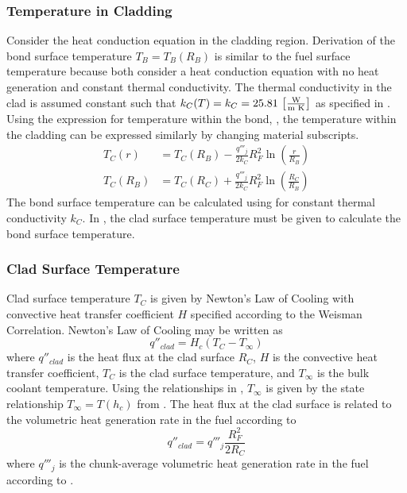     \subsubsection{Temperature in Cladding}
      Consider the heat conduction equation in the cladding region. Derivation
      of the bond surface temperature $T_B=T_B(R_B)$ is similar to
      the fuel surface temperature because both consider a heat conduction
      equation with no heat generation and constant thermal conductivity.
      The
      thermal conductivity in the clad is assumed constant such that $k_C(T) =
      k_C = 25.81 \,\left[\text{{$\frac{\text{W}}{\text{m K}}$}}\right]$ as specified in
      .
      Using the expression for temperature within the bond,
      , the temperature within the cladding can be expressed
      similarly by changing material subscripts. 
      \begin{align}
        \label{eq:tcr}
        T_C(r) &= T_C(R_B) - \frac{q'''_j}{2 k_C} R_F^2
          \ln\left(\frac{r}{R_B}\right) \\
        \label{eq:tb_forward}
        T_C(R_B) &= T_C(R_C) + \frac{q'''_j}{2 k_C} R_F^2
          \ln\left(\frac{R_C}{R_B}\right)
      \end{align}
      The bond surface temperature can be calculated using 
      for constant thermal conductivity $k_C$. In , the clad
      surface temperature must be given to calculate the bond surface
      temperature.

    \subsubsection{Clad Surface Temperature}
      Clad surface temperature $T_C$ is given by Newton's Law of Cooling with
      convective heat transfer coefficient $H$ specified according to the
      Weisman Correlation. Newton's Law of Cooling may be written as
      \begin{equation}
        q''_{clad} = H_c (T_C - T_{\infty})
      \end{equation}
      where $q''_{clad}$ is the heat flux at the clad surface $R_C$, $H$ is
      the convective heat transfer coefficient, $T_C$ is the clad surface
      temperature, and $T_{\infty}$ is the bulk coolant temperature. Using the
      relationships in , $T_{\infty}$ is given
      by the state relationship $T_{\infty} = T(h_c)$ from \cite{sodiumProp}.
      The heat flux at the clad surface is related to the volumetric heat 
      generation rate in the fuel according to 
      \begin{equation}
        q''_{clad} = q'''_j \frac{R_F^2}{2 R_C}
      \end{equation}
      where $q'''_j$ is the chunk-average volumetric heat generation rate in the
      fuel according to .

